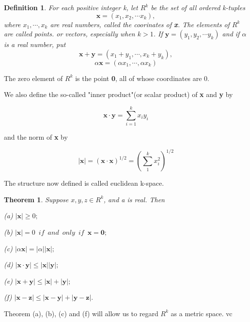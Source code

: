 \documentclass{article}
\newtheorem{defi}{Definition}
\newtheorem{theo}{Theorem}
\begin{document}
\begin{defi}
	For each positive integer k, let $ R^k $ be the set of all ordered k-tuples
	\[
	\textbf{x}=(x_1,x_2,\cdots x_k),
	\]
	where $ x_1,\cdots ,x_k $ are real numbers, called the coorinates of \textbf{x}. The elements of $ R^k $ are called points. or vectors, especially when $ k>1 $. If $ \textbf{y}=(y_1,y_2,\cdots y_k) $ and if $ \alpha $ is a real number, put
	\[
	\textbf{x}+\textbf{y}=(x_1+y_1,\cdots,x_k+y_k),
	\]
	\[
	\alpha\textbf{x}=(\alpha x_1,\cdots,\alpha x_k)
	\]
\end{defi}

The zero element of $ R^k $ is the point \textbf{0}, all of whose coordinates are 0.

We also define the so-called "inner product"(or scalar product) of \textbf{x} and \textbf{y} by

\[
\textbf{x}\cdot \textbf{y}=\sum_{i=1}^{k}x_iy_i
\]

and the norm of \textbf{x} by

\[
|\textbf{x}|=(\textbf{x}\cdot \textbf{x})^{1/2}=(\sum_{1}^{k}x_i^2)^{1/2}
\]

The structure now defined is called euclidean k-space.

\begin{theo}
	Suppose $ x,y,z\in R^k $, and a is real. Then
	
(a)	$ |\textbf{x}|\ge 0; $
	
(b)	$ |\textbf{x}|=0\enspace if\enspace and\enspace only\enspace if\enspace \textbf{x}=\textbf{0}; $
	
(c)	$ |\alpha\textbf{x}|=|\alpha||\textbf{x}|; $
	
(d)	$ |\textbf{x}\cdot\textbf{y}| \le |\textbf{x}||\textbf{y}|;  $
	
(e)	$ |\textbf{x}+\textbf{y}|\le |\textbf{x}|+|\textbf{y}|; $
	
(f)	$ |\textbf{x}-\textbf{z}|\le |\textbf{x}-\textbf{y}|+|\textbf{y}-\textbf{z}|. $
	
\end{theo}

Theorem (a), (b), (c) and (f) will allow us to regard $ R^k $ as a metric space. vc
\end{document}
